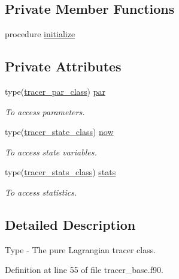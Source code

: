 \subsection*{Private Member Functions}
\begin{DoxyCompactItemize}
\item 
procedure \mbox{\hyperlink{structtracer__base__mod_1_1tracer__class_ac62e2096f59ca322c3bffa6b4d6792da}{initialize}}
\end{DoxyCompactItemize}
\subsection*{Private Attributes}
\begin{DoxyCompactItemize}
\item 
type(\mbox{\hyperlink{structtracer__base__mod_1_1tracer__par__class}{tracer\+\_\+par\+\_\+class}}) \mbox{\hyperlink{structtracer__base__mod_1_1tracer__class_abadf1c607905330dc05f8985f6487a41}{par}}
\begin{DoxyCompactList}\small\item\em To access parameters. \end{DoxyCompactList}\item 
type(\mbox{\hyperlink{structtracer__base__mod_1_1tracer__state__class}{tracer\+\_\+state\+\_\+class}}) \mbox{\hyperlink{structtracer__base__mod_1_1tracer__class_a282d3a68cbf79a87706e0b0bb974dd8f}{now}}
\begin{DoxyCompactList}\small\item\em To access state variables. \end{DoxyCompactList}\item 
type(\mbox{\hyperlink{structtracer__base__mod_1_1tracer__stats__class}{tracer\+\_\+stats\+\_\+class}}) \mbox{\hyperlink{structtracer__base__mod_1_1tracer__class_a688d74f9059a50eba8fdd536c2f79876}{stats}}
\begin{DoxyCompactList}\small\item\em To access statistics. \end{DoxyCompactList}\end{DoxyCompactItemize}


\subsection{Detailed Description}
Type -\/ The pure Lagrangian tracer class. 

Definition at line 55 of file tracer\+\_\+base.\+f90.



